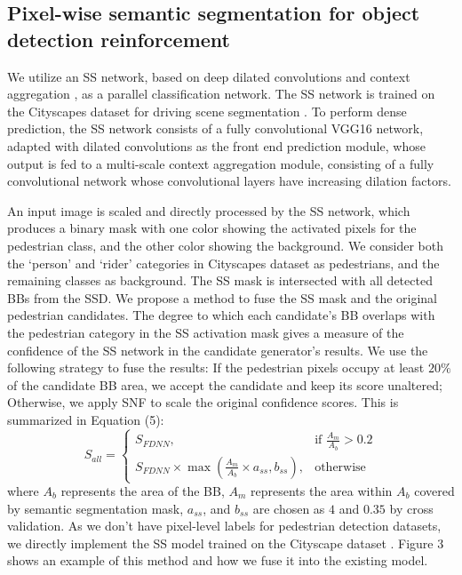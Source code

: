 \documentclass[10pt,letterpaper]{article}
\begin{document}
\subsection{Pixel-wise semantic segmentation for object detection reinforcement} 
We utilize an SS network, based on deep dilated convolutions and context aggregation \cite{sspaper}, as a parallel classification network. The SS network is trained on the Cityscapes dataset for driving scene segmentation \cite{cityscapes}. To perform dense prediction, the SS network consists of a fully convolutional VGG16 network, adapted with dilated convolutions as the front end prediction module, whose output is fed to a multi-scale context aggregation module, consisting of a fully convolutional network whose convolutional layers have increasing dilation factors. 

An input image is scaled and directly processed by the SS network, which produces a binary mask with one color showing the activated pixels for the pedestrian class, and the other color showing the background. We consider both the `person' and `rider' categories in Cityscapes dataset as pedestrians, and the remaining classes as background. The SS mask is intersected with all detected BBs from the SSD. We propose a method to fuse the SS mask and the original pedestrian candidates. The degree to which each candidate's BB overlaps with the pedestrian category in the SS activation mask gives a measure of the confidence of the SS network in the candidate generator's results. We use the following strategy to fuse the results: If the pedestrian pixels occupy at least $20\%$ of the candidate BB area, we accept the candidate and keep its score unaltered; Otherwise, we apply SNF to scale the original confidence scores. This is summarized in Equation (5):
\begin{equation} \label{}
    S_{all}=
\begin{cases}
    S_{FDNN},& \text{if } \frac{A_m}{A_b}>0.2 \\ 
    S_{FDNN}\times \max(\frac{A_m}{A_b}\times a_{ss}, b_{ss}), & \text{otherwise}
\end{cases}
\end{equation}
where $A_{b}$ represents the area of the BB, $A_m$ represents the area within $A_b$ covered by semantic segmentation mask, $a_{ss}$, and $b_{ss}$ are chosen as $4$ and $0.35$ by cross validation. As we don't have pixel-level labels for pedestrian detection datasets, we directly implement the SS model \cite{sspaper} trained on the Cityscape dataset \cite{cityscapes}. Figure 3 shows an example of this method and how we fuse it into the existing model.
\end{document}
